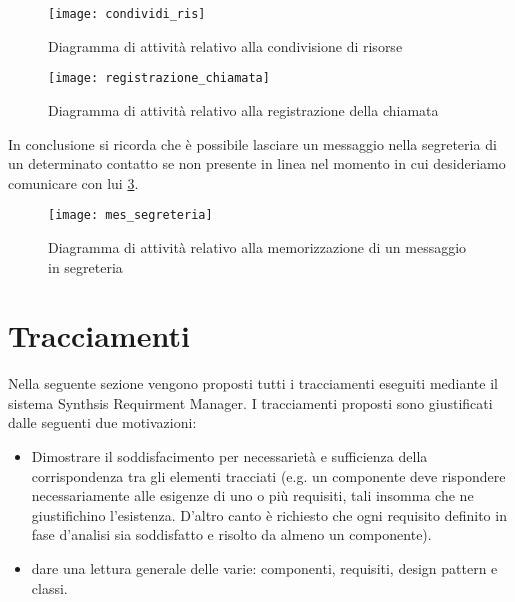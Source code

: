\begin{figure}[H]
\centering
\texttt{[image: condividi\_ris]}
\caption{Diagramma di attività relativo alla condivisione di risorse}\label{fig:ADcondrisorse}
\end{figure}

\begin{figure}[H]
\centering
\texttt{[image: registrazione\_chiamata]}
\caption{Diagramma di attività relativo alla registrazione della chiamata}\label{fig:ADregistrachiamata}
\end{figure}

In conclusione si ricorda che è possibile lasciare un messaggio nella segreteria di un determinato contatto se non presente in linea nel momento in cui desideriamo comunicare con lui \ref{fig:ADmessegreteria}.

\begin{figure}[H]
\centering
\texttt{[image: mes\_segreteria]}
\caption{Diagramma di attività relativo alla memorizzazione di un messaggio in segreteria}\label{fig:ADmessegreteria}
\end{figure}

\clearpage

\section{Tracciamenti}
Nella seguente sezione vengono proposti tutti i tracciamenti eseguiti mediante il sistema Synthsis Requirment Manager. I tracciamenti proposti sono giustificati dalle seguenti due motivazioni:

\begin{itemize}
	\item Dimostrare il soddisfacimento per necessarietà e sufficienza della corrispondenza tra gli elementi tracciati (e.g. un componente deve rispondere necessariamente alle esigenze di uno o più requisiti, tali insomma che ne giustifichino l'esistenza. D'altro canto è richiesto che ogni requisito definito in fase d'analisi sia soddisfatto e risolto da almeno un componente).
	\item dare una lettura generale delle varie: componenti, requisiti, design pattern e classi.
\end{itemize}




